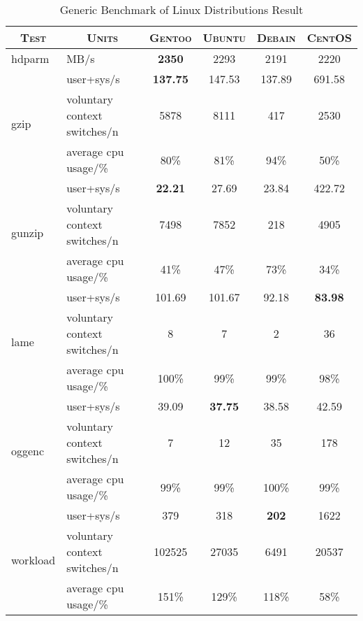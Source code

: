 \begin{table}[ht]
  \centering
  \caption{Generic Benchmark of Linux Distributions Result}
  \label{tab:os_generic_benchmark}
  
  \begin{tabular}{l|l|c|c|c|c}

    \multicolumn{1}{c|}{\textbf{\textsc{Test}}} & \multicolumn{1}{c|}{\textbf{\textsc{Units}}} & \textbf{\textsc{Gentoo}} & \textbf{\textsc{Ubuntu}} & \textbf{\textsc{Debain}} & \textbf{\textsc{CentOS}} \\ \hline
    hdparm & MB/s & \textbf{2350} & 2293 & 2191 & 2220 \\ \hline\hline

    \multirow{3}{*}{gzip} & user+sys/s & \textbf{137.75} & 147.53 & 137.89 & 691.58 \\ \cline{2-6}
    & voluntary context switches/n & 5878 & 8111 & 417 & 2530 \\ \cline{2-6}
    & average cpu usage/\% & 80\% & 81\% & 94\% & 50\% \\ \hline\hline

    \multirow{3}{*}{gunzip} & user+sys/s & \textbf{22.21} & 27.69 & 23.84 & 422.72 \\ \cline{2-6}
    & voluntary context switches/n & 7498 & 7852 & 218 & 4905 \\ \cline{2-6}
    & average cpu usage/\% & 41\% & 47\% & 73\% & 34\% \\ \hline\hline

    \multirow{3}{*}{lame} & user+sys/s & 101.69 & 101.67 & 92.18 & \textbf{83.98} \\ \cline{2-6}
    & voluntary context switches/n & 8 & 7 & 2 & 36 \\ \cline{2-6}
    & average cpu usage/\% & 100\% & 99\% & 99\% & 98\% \\ \hline\hline

    \multirow{3}{*}{oggenc} & user+sys/s & 39.09 & \textbf{37.75} & 38.58 & 42.59 \\ \cline{2-6}
    & voluntary context switches/n & 7 & 12 & 35 & 178 \\ \cline{2-6}
    & average cpu usage/\% & 99\% & 99\% & 100\% & 99\% \\ \hline\hline

    \multirow{3}{*}{workload} & user+sys/s & 379 & 318 & \textbf{202} & 1622 \\ \cline{2-6}
    & voluntary context switches/n & 102525 & 27035 & 6491 & 20537 \\ \cline{2-6}
    & average cpu usage/\% & 151\% & 129\% & 118\% & 58\% \\
  \end{tabular}
\end{table}
